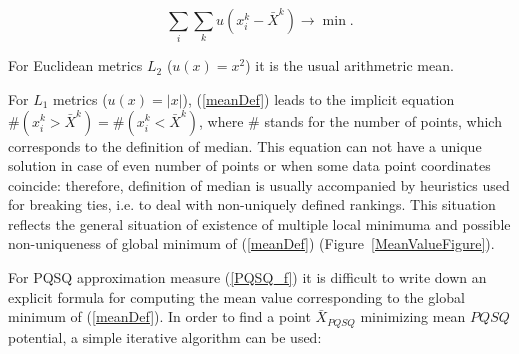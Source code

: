 \documentclass[preprint,12pt,twocolumn]{elsarticle}
\makeatletter
\def\BState{\State\hskip-\ALG@thistlm}
\makeatother
\begin{document}
\begin{equation}\label{meanDef}
\sum_i\sum_k u(x_i^k-\bar{X}^k) \rightarrow \min.
\end{equation}

For Euclidean metrics $L_2$ ($u(x)=x^2$) it is the usual arithmetric mean.

For $L_1$ metrics ($u(x)=|x|$), (\ref{meanDef}) leads to the implicit equation $\#(x_i^k>\bar{X}^k)=\#(x_i^k<\bar{X}^k)$, where $\#$ stands for the number of points, which corresponds to the definition of median. This equation can not have a unique solution in case of even number of points or when some data point coordinates coincide: therefore, definition of median is usually accompanied by heuristics used for breaking ties, i.e. to deal with non-uniquely defined rankings. This situation reflects the general situation of existence of multiple local minimuma and possible non-uniqueness of global minimum of (\ref{meanDef}) (Figure~\ref{MeanValueFigure}).

For PQSQ approximation measure (\ref{PQSQ_f}) it is difficult to write down an explicit formula for computing the mean value
corresponding to the global minimum of (\ref{meanDef}).
In order to find a point $\bar{X}_{PQSQ}$ minimizing mean $PQSQ$ potential, a simple iterative algorithm can be used:

\end{document}
